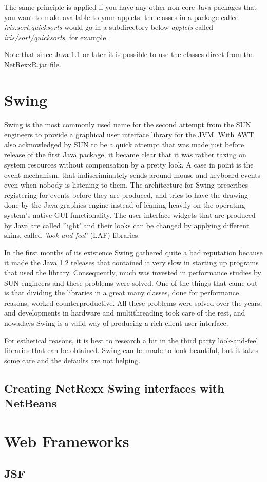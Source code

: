 The same principle is applied if you have any other non-core Java
packages that you want to make available to your applets: the classes in
a package called \emph{iris.sort.quicksorts} would go in a subdirectory
below \emph{applets} called \emph{iris/sort/quicksorts}, for example.

Note that since Java 1.1 or later it is possible to use the
classes direct from the NetRexxR.jar file.

\section{Swing}
Swing is the most commonly used name for the second attempt from the
SUN engineers to provide a graphical user interface library for the
JVM. With AWT also acknowledged by SUN to be a quick attempt that was
made just before release of the first Java package, it became clear
that it was rather taxing on system resources without compensation by
a pretty look. A case in point is the event mechanism, that
indiscriminately sends around mouse and keyboard events even when
nobody is listening to them. The architecture for Swing prescribes
registering for events before they are produced, and tries to have the
drawing done by the Java graphics engine instead of leaning heavily on
the operating system's native GUI functionality. The user interface
widgets that are produced by Java are called 'light' and their looks
can be changed by applying different skins, called \emph{'look-and-feel'} (LAF)
libraries.

In the first months of its existence Swing gathered quite a bad reputation because it made
the Java 1.2 releases that contained it very slow in starting up
programs that used the library. Consequently, much was invested in
performance studies by SUN engineers and these problems were
solved. One of the things that came out is that dividing the libraries
in a great many classes, done for performance reasons, worked
counterproductive. All these problems were solved over the years, and
developments in hardware and multithreading took care of the rest, and
nowadays Swing is a valid way of producing a rich client user
interface.

For esthetical reasons, it is best to research a bit in the third
party look-and-feel libraries that can be obtained. Swing can be made
to look beautiful, but it takes some care and the defaults are not helping.
\subsection{Creating NetRexx Swing interfaces with NetBeans}
\section{Web Frameworks}
\subsection{JSF}

